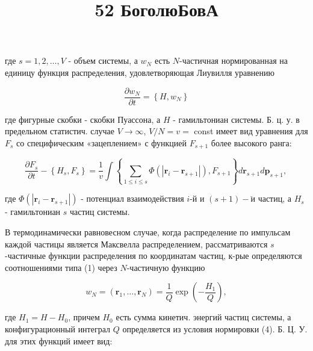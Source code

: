 \documentclass[10pt]{article}
\title{52 БоголюБовА }
\author{}
\date{}
\begin{document}
\maketitle

где $s=1,2, \ldots, V$ - объем системы, а $w_{N}$ есть $N$-частичная нормированная на единицу функция распределения, удовлетворяющая Лиувилля уравнению



\[

\frac{\partial w_{N}}{\partial t}=\left\{H, w_{N}\right\}

\]



где фигурные скобки - скобки Пуассона, а $H$ - гамильтониан системы. Б. ц. у. в предельном статистич. случае $V \rightarrow \infty$, $V / N=v=$ const имеет вид уравнения для $F_{s}$ со специфическим «зацеплением» с функцией $F_{s+1}$ более высокого ранга:



\[

\frac{\partial F_{s}}{\partial t}-\left\{H_{s}, F_{s}\right\}=\frac{1}{v} \int\left\{\sum_{1 \leqslant i \leqslant s} \Phi\left(\left|\boldsymbol{r}_{i}-\boldsymbol{r}_{s+1}\right|\right), F_{s+1}\right\} d \boldsymbol{r}_{s+1} d \boldsymbol{p}_{s+1} \text {, }

\]



где $\Phi\left(\left|\boldsymbol{r}_{i}-\boldsymbol{r}_{s+1}\right|\right)$ - потенциал взаимодействия $i$-й и $(s+1)-\breve{и}$ частиц, а $H_{s}$ - гамильтониан $s$ частиц системы.



В термодинамически равновесном случае, когда распределение по импульсам каждой частицы является Максвелла распределением, рассматриваются $s$-частичные функции распределения по координатам частиц, к-рые определяются соотношениями типа (1) через $N$-частичную функцию



\[

w_{N}=\left(\boldsymbol{r}_{1}, \ldots, \boldsymbol{r}_{N}\right)=\frac{1}{Q} \exp \left(-\frac{H_{1}}{Q}\right),

\]



где $H_{1}=H-H_{0}$, причем $H_{0}$ есть сумма кинетич. энергий частиц системы, а конфигурационный интеграл $Q$ определяется из условия нормировки (4). Б. Ц. У. для этих функций имеет вид:
\end{document}
